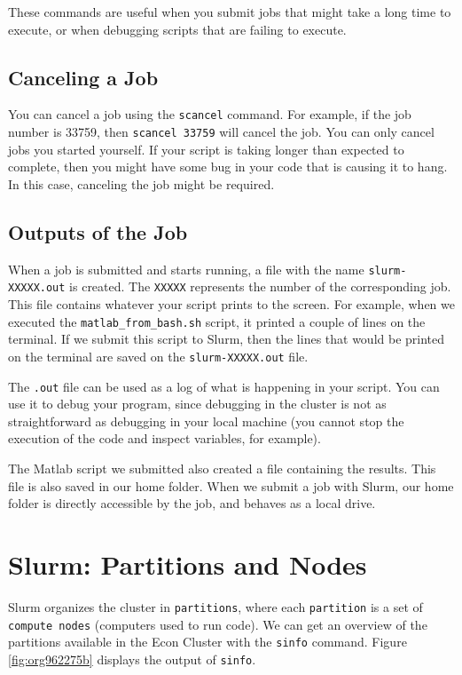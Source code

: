 \documentclass[12pt, a4paper]{article}
\begin{document}
These commands are useful when you submit jobs that might take a long time to execute, or when debugging scripts that are failing to execute.
\subsection{Canceling a Job}
\label{sec:org2d469a7}
You can cancel a job using the \texttt{scancel} command.
For example, if the job number is 33759, then \texttt{scancel 33759} will cancel the job.
You can only cancel jobs you started yourself.
If your script is taking longer than expected to complete, then you might have some bug in your code that is causing it to hang.
In this case, canceling the job might be required.
\subsection{Outputs of the Job}
\label{sec:orgdf2bc2e}
When a job is submitted and starts running, a file with the name \texttt{slurm-XXXXX.out} is created.
The \texttt{XXXXX} represents the number of the corresponding job.
This file contains whatever your script prints to the screen.
For example, when we executed the \texttt{matlab\_from\_bash.sh} script, it printed a couple of lines on the terminal.
If we submit this script to Slurm, then the lines that would be printed on the terminal are saved on the \texttt{slurm-XXXXX.out} file.

The \texttt{.out} file can be used as a log of what is happening in your script.
You can use it to debug your program, since debugging in the cluster is not as straightforward as debugging in your local machine (you cannot stop the execution of the code and inspect variables, for example).

The Matlab script we submitted also created a file containing the results. This file is also saved in our home folder.
When we submit a job with Slurm, our home folder is directly accessible by the job, and behaves as a local drive.

\section{Slurm: Partitions and Nodes}
\label{sec:org423e3eb}
Slurm organizes the cluster in \texttt{partitions}, where each \texttt{partition} is a set of \texttt{compute nodes} (computers used to run code).
We can get an overview of the partitions available in the Econ Cluster with the \texttt{sinfo} command.
Figure \ref{fig:org962275b} displays the output of \texttt{sinfo}.
\end{document}
